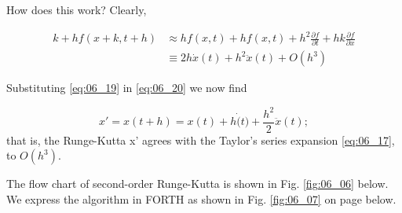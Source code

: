 How does this work? Clearly,

\begin{equation}
\begin{aligned}
    k + hf(x+k,t+h) & \approx hf(x,t) + hf(x,t) + h^2\frac{\partial f}{\partial t} + hk \frac{\partial f}{\partial x} \\
    & \equiv 2h\dot{x}(t) + h^2\ddot{x}(t) + O(h^3)
    \label{eq:06_20} 
\end{aligned}
\end{equation}

Substituting \ref{eq:06_19} in \ref{eq:06_20} we now find

\begin{equation*}
    x' = x(t+h) = x(t) + h\dot(t) + \frac{h^2}{2}\ddot{x}(t) ;
\end{equation*}
that is, the Runge-Kutta x' agrees with the Taylor's series expansion \ref{eq:06_17}, to $O(h^3)$.

The flow chart of second-order Runge-Kutta is shown in Fig. \ref{fig:06_06} below. We express the algorithm in FORTH as shown in Fig.  \ref{fig:06_07} on page \pageref{fig:06_07} below.

